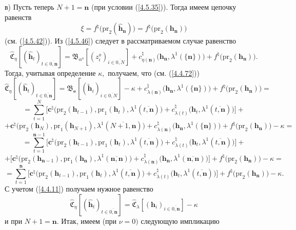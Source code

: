 \documentclass[11pt,twoside,openany]{report}
\newcommand{\bfn}{\begin{equation}}
\newcommand{\efn}{\end{equation}}
\newcommand{\ov}{\overline}
\newcommand{\la}{\lambda}
\newcommand{\al}{\alpha}
\begin{document}
{{в) Пусть теперь $N+1 = \mathbf{n}$ (при  условии (\ref{4.5.35})). Тогда имеем цепочку равенств
\bfn\label{4.5.50}
\xi = f^\natural\bigl(\mathrm{pr}_2(\hat{\mathbf{h}}_\mathbf{n})\bigl) =
f^\natural\bigl(\mathrm{pr}_2(\mathbf{h}_\mathbf{n})\bigl)
\efn
(см. (\ref{4.5.42})). Из (\ref{4.5.46}) следует в рассматриваемом случае равенство
$$\widehat{\mathfrak{C}}_\eta[(\hat{\mathbf{h}}_t)_{t\in\ov{0,\mathbf{n}}}] =
\mathfrak{B}_{\al^o}[(z_i^o)_{i\in\ov{0,N}}] +
c_{\eta(\mathbf{n})}^\natural\bigl(\mathbf{h}_\mathbf{n},\la^1(\{\mathbf{n}\})\bigl) +
f^\natural\bigl(\mathrm{pr}_2(\mathbf{h}_\mathbf{n})\bigl).
$$
Тогда, учитывая определение $\kappa,$ получаем, что (см. (\ref{4.4.72}))
$$
\widehat{\mathfrak{C}}_\eta[(\hat{\mathbf{h}}_t)_{t\in\ov{0,\mathbf{n}}}] =
\mathfrak{B}_\mathbf{e}[(\tilde{\mathbf{h}}_i)_{i\in\ov{0,N}}] - \kappa +
c_{\la(\mathbf{n})}^\natural\bigl(\mathbf{h}_\mathbf{n},\la^1(\{\mathbf{n}\})\bigl) +
f^\natural\bigl(\mathrm{pr}_2(\mathbf{h}_\mathbf{n})\bigl) =
$$
$$
= \sum\limits_{t=1}^N\bigl[\mathbf{c}^\natural\bigl(\mathrm{pr}_2(\mathbf{h}_{t-1}),\mathrm{pr}_1
(\mathbf{h}_t), \la^1(\ov{t,\mathbf{n}})\bigl) + c_{\la(t)}^\natural\bigl(\mathbf{h}_t,
\la^1(\ov{t,\mathbf{n}})\bigl)\bigl] +
$$
$$
+ \mathbf{c}^\natural\bigl(\mathrm{pr}_2(\mathbf{h}_N),
\mathrm{pr}_1(\mathbf{h}_{N+1}),
\la^1(\ov{N+1,\mathbf{n}})\bigl) +
c_{\la(\mathbf{n})}^\natural\bigl(\mathbf{h}_\mathbf{n},\la^1 (\{\mathbf{n}\})\bigl) +
f^\natural\bigl(\mathrm{pr}_2(\mathbf{h}_\mathbf{n})\bigl) -\kappa =
$$
$$
=\sum\limits_{t=1}^{\mathbf{n}-1}\bigl[\mathbf{c}^\natural\bigl(\mathrm{pr}_2(\mathbf{h}_{t-1}),
\mathrm{pr}_1(\mathbf{h}_t), \la^1(\ov{t,\mathbf{n}})\bigl) +
c_{\la(t)}^\natural\bigl(\mathbf{h}_t,\la^1(\ov{t,\mathbf{n}})\bigl)\bigl] +
$$
$$
+\bigl[\mathbf{c}^\natural\bigl(\mathrm{pr}_2(\mathbf{h}_{\mathbf{n}-1}),\mathrm{pr}_1
(\mathbf{h}_\mathbf{n}),\la^1(\ov{\mathbf{n},\mathbf{n}})\bigl) +
c_{\la(\mathbf{n})}^\natural\bigl(\mathbf{h}_\mathbf{n},\la^1(\ov{\mathbf{n},\mathbf{n}})\bigl)\bigl] +
f^\natural\bigl(\mathrm{pr}_2(\mathbf{h}_\mathbf{n})\bigl) - \kappa =
$$
$$
= \sum\limits_{t=1}^\mathbf{n}\bigl[\mathbf{c}^\natural\bigl(\mathrm{pr}_2(\mathbf{h}_{t-1}),
\mathrm{pr}_1(\mathbf{h}_t),\la^1(\ov{t,\mathbf{n}})\bigl) +
c_{\la(t)}^\natural\bigl(\mathbf{h}_t,\la^1(\ov{t,\mathbf{n}})\bigl)\bigl]
+f^\natural\bigl(\mathrm{pr}_2(\mathbf{h}_\mathbf{n})\bigl) - \kappa.
$$
С учетом (\ref{4.4.11}) получаем нужное равенство
$$
\widehat{\mathfrak{C}}_\eta[(\hat{\mathbf{h}}_t)_{t\in\ov{0,\mathbf{n}}}] =
\widehat{\mathfrak{C}}_\la[(\mathbf{h}_i)_{i\in\ov{0,\mathbf{n}}}] - \kappa
$$
и при $N+1 = \mathbf{n}.$ Итак, имеем (при $\nu = 0)$ следующую импликацию
}}
\end{document}
